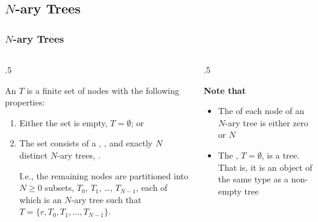 \documentclass[10pt]{beamer}
\begin{document}




\subsection{$N$-ary Trees}
\begin{frame}[t]\frametitle{$N$-ary Trees}
	\begin{columns}[T] %
	\begin{column}{.5\linewidth} %
		{\small
 		\begin{definition}
		An  $T$ is a finite set of nodes
		with the following properties:
		\begin{enumerate}
			\item 
			Either the set is empty, $T=\emptyset$; or
			
			\item 
			The set consists of a , ,
			and exactly $N$ distinct $N$-ary trees, .
			
			I.e., the remaining nodes are partitioned into $N \ge 0$ subsets,
			$T_{0}$, $T_{1}$, \ldots, $T_{N-1}$, each of which is an $N$-ary tree
			such that $T = \{ r, T_{0}, T_{1}, \ldots, T_{N-1} \}$.
		\end{enumerate}
		\end{definition}
		} %
	\end{column} %
	\begin{column}{.5\linewidth} %
		{\small 
		\textbf{Note that}
		\begin{itemize}
	
			\item
			The  of each node of an $N$-ary tree is either zero or $N$

			\item
			The , $T = \emptyset$, is a tree.
			That is, 
			it is an object of the same type as a non-empty tree

		\end{itemize}
		} %
	\end{column} %
	\end{columns} %
\end{frame}
\end{document}
